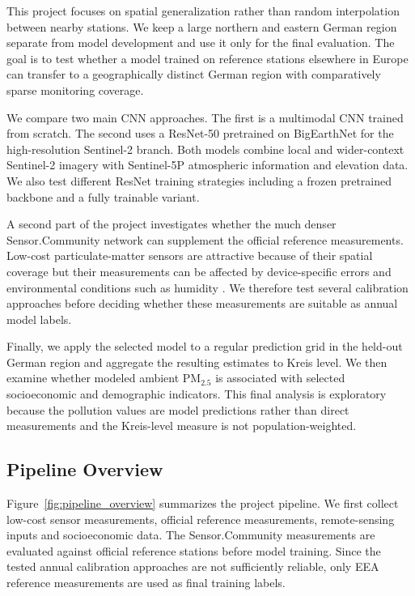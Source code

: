 \documentclass[english, a4paper]{article}
\begin{document}
This project focuses on spatial generalization rather than random interpolation between nearby stations. We keep a large northern and eastern German region separate from model development and use it only for the final evaluation. The goal is to test whether a model trained on reference stations elsewhere in Europe can transfer to a geographically distinct German region with comparatively sparse monitoring coverage.

We compare two main CNN approaches. The first is a multimodal CNN trained from scratch. The second uses a ResNet-50 pretrained on BigEarthNet for the high-resolution Sentinel-2 branch. Both models combine local and wider-context Sentinel-2 imagery with Sentinel-5P atmospheric information and elevation data. We also test different ResNet training strategies including a frozen pretrained backbone and a fully trainable variant.

A second part of the project investigates whether the much denser Sensor.Community network can supplement the official reference measurements. Low-cost particulate-matter sensors are attractive because of their spatial coverage but their measurements can be affected by device-specific errors and environmental conditions such as humidity \citep{benabbas2019particulate,weissert2023moma}. We therefore test several calibration approaches before deciding whether these measurements are suitable as annual model labels.

Finally, we apply the selected model to a regular prediction grid in the held-out German region and aggregate the resulting estimates to Kreis level. We then examine whether modeled ambient PM$_{2.5}$ is associated with selected socioeconomic and demographic indicators. This final analysis is exploratory because the pollution values are model predictions rather than direct measurements and the Kreis-level measure is not population-weighted.


\subsection{Pipeline Overview}
\label{sec:pipeline}

Figure~\ref{fig:pipeline_overview} summarizes the project pipeline. We first collect low-cost sensor measurements, official reference measurements, remote-sensing inputs and socioeconomic data. The Sensor.Community measurements are evaluated against official reference stations before model training. Since the tested annual calibration approaches are not sufficiently reliable, only EEA reference measurements are used as final training labels.
\end{document}
